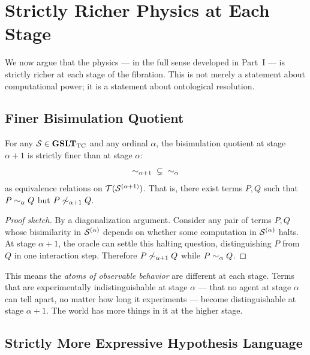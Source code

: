 \chapter{Strictly Richer Physics at Each Stage}
\label{sec:richer}

We now argue that the physics --- in the full sense developed in
Part~I --- is strictly richer at each stage of the fibration.
This is not merely a statement about computational power;
it is a statement about ontological resolution.

\section{Finer Bisimulation Quotient}

\begin{proposition}
\label{prop:strict-bisim}
For any $\mathcal{S} \in \mathbf{GSLT}_{\mathrm{TC}}$ and any ordinal $\alpha$,
the bisimulation quotient at stage $\alpha+1$ is strictly finer than
at stage $\alpha$:
\[
  {\sim_{\alpha+1}} \;\subsetneq\; {\sim_\alpha}
\]
as equivalence relations on $\mathcal{T}(\mathcal{S}^{(\alpha+1)})$.
That is, there exist terms $P, Q$ such that $P \sim_\alpha Q$ but
$P \not\sim_{\alpha+1} Q$.
\end{proposition}

\begin{proof}[Proof sketch]
By a diagonalization argument.
Consider any pair of terms $P, Q$ whose bisimilarity in
$\mathcal{S}^{(\alpha)}$ depends on whether some computation in
$\mathcal{S}^{(\alpha)}$ halts.
At stage $\alpha+1$, the oracle can settle this halting question,
distinguishing $P$ from $Q$ in one interaction step.
Therefore $P \not\sim_{\alpha+1} Q$ while $P \sim_\alpha Q$.
\end{proof}

\begin{remark}
This means the \emph{atoms of observable behavior} are different
at each stage.
Terms that are experimentally indistinguishable at stage $\alpha$
--- that no agent at stage $\alpha$ can tell apart, no matter how
long it experiments --- become distinguishable at stage $\alpha+1$.
The world has more things in it at the higher stage.
\end{remark}

\section{Strictly More Expressive Hypothesis Language}

